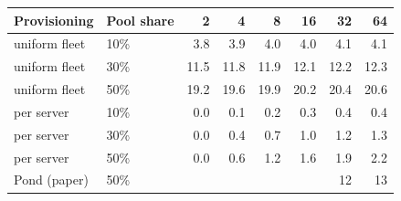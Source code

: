 \begin{tabular}{llrrrrrr}
\toprule
Provisioning & Pool share & 2 & 4 & 8 & 16 & 32 & 64 \\
\midrule
uniform fleet & 10\% & 3.8 & 3.9 & 4.0 & 4.0 & 4.1 & 4.1 \\
uniform fleet & 30\% & 11.5 & 11.8 & 11.9 & 12.1 & 12.2 & 12.3 \\
uniform fleet & 50\% & 19.2 & 19.6 & 19.9 & 20.2 & 20.4 & 20.6 \\
per server & 10\% & 0.0 & 0.1 & 0.2 & 0.3 & 0.4 & 0.4 \\
per server & 30\% & 0.0 & 0.4 & 0.7 & 1.0 & 1.2 & 1.3 \\
per server & 50\% & 0.0 & 0.6 & 1.2 & 1.6 & 1.9 & 2.2 \\
\midrule
Pond (paper) & 50\% & \multicolumn{4}{c}{} & 12 & 13 \\
\bottomrule
\end{tabular}

